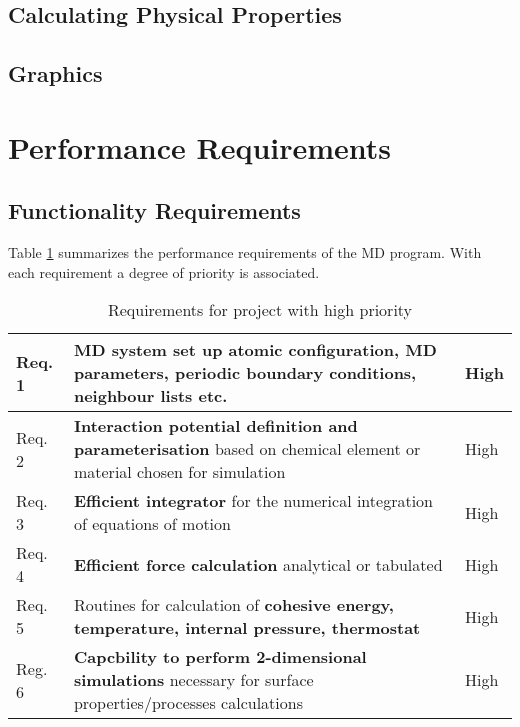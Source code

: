 \documentclass[12pt,a4paper]{article}
\begin{document}
\subsection{Calculating Physical Properties}

\subsection{Graphics}

\newpage
\section{Performance Requirements}

\subsection{Functionality Requirements}
Table \ref{tab:Requirements} summarizes the performance requirements of the MD program. With each requirement a degree of priority is associated.

\begin{table}[h]
\caption{Requirements for project with high priority}
\begin{tabular}{| p{} | p{} | p{} |}
	\hline
	Req. 1 & \textbf{MD system set up} atomic configuration, MD parameters, periodic boundary conditions,  neighbour lists etc. & High \\
	\hline
	Req. 2 & \textbf{Interaction potential definition and parameterisation} based on chemical element or material chosen for simulation & High \\
	\hline
	Req. 3 & \textbf{Efficient integrator} for the numerical integration of equations of motion & High \\
	\hline
	Req. 4 & \textbf{Efficient force calculation} analytical or tabulated & High \\
	\hline
	Req. 5 & Routines for calculation of  \textbf{cohesive energy, temperature, internal pressure, thermostat} & High \\
	\hline
	Reg. 6 & \textbf{Capcbility to perform 2-dimensional simulations} necessary for surface properties/processes calculations & High \\
	\hline 
\end{tabular}
\label{tab:Requirements}
\end{table}
\end{document}
